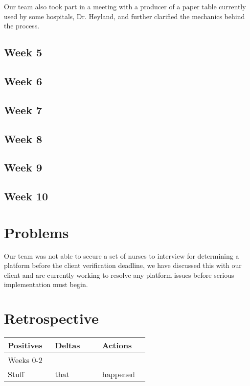 \documentclass[onecolumn, draftclsnofoot,10pt, compsoc]{IEEEtran}
\begin{document}
Our team also took part in a meeting with a producer of a paper table currently used by some hospitals, Dr. Heyland, and further clarified the mechanics behind the process.
\subsection{Week 5}
\subsection{Week 6}
\subsection{Week 7}
\subsection{Week 8}
\subsection{Week 9}
\subsection{Week 10}
\section{Problems}
Our team was not able to secure a set of nurses to interview for determining a platform before the client verification deadline, we have discussed this with our client and are currently working to resolve any platform issues before serious implementation must begin.
\section{Retrospective}
\begin{tabular}{p{0.3\linewidth} p{0.3\linewidth} p{0.3\linewidth}}
\large{Positives} & \large{Deltas} & \large{Actions}\\
\hline
Weeks 0-2 & \nobreakspace & \nobreakspace\\
\hline
Stuff & that & happened\\
\hline


\end{tabular}
\end{document}
